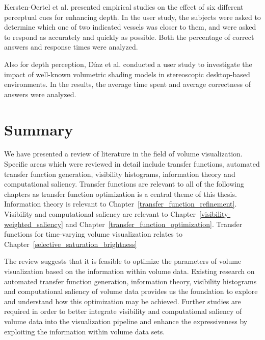 Kersten-Oertel et al. \cite{kersten-oertel_evaluation_2014} presented empirical studies on the effect of six different perceptual cues for enhancing depth. In the user study, the subjects were asked to determine which one of two indicated vessels was closer to them, and were asked to respond as accurately and quickly as possible. Both the percentage of correct answers and response times were analyzed.

Also for depth perception, D{\'i}az et al. \cite{diaz_perceptual_2015} conducted a user study to investigate the impact of well-known volumetric shading models \cite{kniss_model_2003} in stereoscopic desktop-based environments. In the results, the average time spent and average correctness of answers were analyzed.

\section{Summary}
We have presented a review of literature in the field of volume visualization.
Specific areas which were reviewed in detail include transfer functions, automated transfer function generation, visibility histograms, information theory and computational saliency.
Transfer functions are relevant to all of the following chapters as transfer function optimization is a central theme of this thesis.
Information theory is relevant to Chapter~\ref{transfer_function_refinement}.
Visibility and computational saliency are relevant to Chapter~\ref{visibility-weighted_saliency} and Chapter~\ref{transfer_function_optimization}.
Transfer functions for time-varying volume visualization relates to Chapter~\ref{selective_saturation_brightness}

The review suggests that it is feasible to optimize the parameters of volume visualization based on the information within volume data. Existing research on automated transfer function generation, information theory, visibility histograms and computational saliency of volume data provides us the foundation to explore and understand how this optimization may be achieved.
Further studies are required in order to better integrate visibility and computational saliency of volume data into the visualization pipeline and enhance the expressiveness by exploiting the information within volume data sets.

